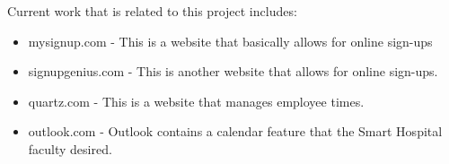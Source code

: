 \begin{flushleft}
Current work that is related to this project includes: 
\end{flushleft}
\begin{itemize}
	\item mysignup.com - This is a website that basically allows for online sign-ups 
	\item signupgenius.com - This is another website that allows for online sign-ups.
	\item quartz.com - This is a website that manages employee times. 
	\item outlook.com - Outlook contains a calendar feature that the Smart Hospital faculty desired. 
\end{itemize}

